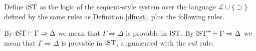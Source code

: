 \begin{dfn}\label{dfn:ist}
	Define $\ist$ as the logic of the sequent-style system over the language $\mathcal{L} \cup \{\supset\}$ defined by the same rules as Definition \ref{dfn:st}, plus the following rules.
\end{dfn}
\begin{multicols}{2}
  \begin{prooftree}
  \end{prooftree}
  \columnbreak
  \begin{prooftree}
  \end{prooftree}
\end{multicols}
By $\ist \vdash \Gamma \Rightarrow \Delta$ we mean that $\Gamma \Rightarrow \Delta$ is provable in $\ist$.
By $\ist^+ \vdash \Gamma \Rightarrow \Delta$ we mean that $\Gamma \Rightarrow \Delta$ is provable in $\ist$, augumented with the $cut$ rule.